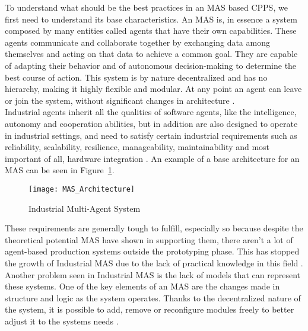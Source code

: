 
To understand what should be the best practices in an \acrshort{MAS} based \acrshort{CPPS}, we first need to understand its base characteristics. An \acrshort{MAS} is, in essence a system composed by many entities called agents that have their own capabilities. These agents communicate and collaborate together by exchanging data among themselves and acting on that data to achieve a common goal. They are capable of adapting their behavior and of autonomous decision-making to determine the best course of action. This system is by nature decentralized and has no hierarchy, making it highly flexible and modular. At any point an agent can leave or join the system, without significant changes in architecture \cite{paulo02}.\\

Industrial agents inherit all the qualities of software agents, like the intelligence, autonomy and cooperation abilities, but in addition are also designed to operate in industrial settings, and need to satisfy certain industrial requirements such as reliability, scalability, resilience, manageability, maintainability and most important of all, hardware integration \cite{Leitao2021}. An example of a base architecture for an \acrshort{MAS} can be seen in Figure~\ref{fig:MAS_Architecture}. \\

\begin{figure}[h!]
	\centering
	\texttt{[image: MAS\_Architecture]}
	\caption{Industrial Multi-Agent System}
	\label{fig:MAS_Architecture}
\end{figure}

These requirements are generally tough to fulfill, especially so because despite the theoretical potential \acrshort{MAS} have shown in supporting them, there aren't a lot of agent-based production systems outside the prototyping phase. This has stopped the growth of Industrial \acrshort{MAS} due to the lack of practical knowledge in this field \cite{Karnouskos2019}. Another problem seen in Industrial \acrshort{MAS} is the lack of models that can represent these systems. One of the key elements of an \acrshort{MAS} are the changes made in structure and logic as the system operates. Thanks to the decentralized nature of the system, it is possible to add, remove or reconfigure modules freely to better adjust it to the systems needs \cite{Karnouskos2019}.\\

